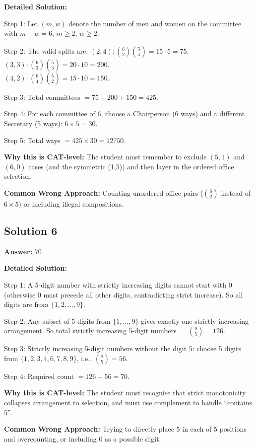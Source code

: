 \documentclass[11pt]{article}
\begin{document}
\textbf{Detailed Solution:}

Step 1: Let \( (m, w) \) denote the number of men and women on the committee with \( m + w = 6 \), \( m \ge 2 \), \( w \ge 2 \).

Step 2: The valid splits are:
\( (2, 4): \binom{6}{2}\binom{5}{4} = 15 \cdot 5 = 75. \) \\
\( (3, 3): \binom{6}{3}\binom{5}{3} = 20 \cdot 10 = 200. \) \\
\( (4, 2): \binom{6}{4}\binom{5}{2} = 15 \cdot 10 = 150. \)

Step 3: Total committees \( = 75 + 200 + 150 = 425 \).

Step 4: For each committee of 6, choose a Chairperson (6 ways) and a different Secretary (5 ways): \( 6 \times 5 = 30 \).

Step 5: Total ways \( = 425 \times 30 = 12750 \).

\textbf{Why this is CAT-level:} The student must remember to exclude \( (5,1) \) and \( (6,0) \) cases (and the symmetric (1,5)) and then layer in the ordered office selection.

\textbf{Common Wrong Approach:} Counting unordered office pairs (\( \binom{6}{2} \) instead of \( 6 \times 5 \)) or including illegal compositions.

\subsection*{Solution 6}
\textbf{Answer:} 70

\textbf{Detailed Solution:}

Step 1: A 5-digit number with strictly increasing digits cannot start with 0 (otherwise 0 must precede all other digits, contradicting strict increase). So all digits are from \( \{1, 2, \ldots, 9\} \).

Step 2: Any subset of 5 digits from \( \{1,\ldots,9\} \) gives exactly one strictly increasing arrangement. So total strictly increasing 5-digit numbers \( = \binom{9}{5} = 126 \).

Step 3: Strictly increasing 5-digit numbers without the digit 5: choose 5 digits from \( \{1,2,3,4,6,7,8,9\} \), i.e., \( \binom{8}{5} = 56 \).

Step 4: Required count \( = 126 - 56 = 70 \).

\textbf{Why this is CAT-level:} The student must recognise that strict monotonicity collapses arrangement to selection, and must use complement to handle ``contains 5''.

\textbf{Common Wrong Approach:} Trying to directly place 5 in each of 5 positions and overcounting, or including 0 as a possible digit.
\end{document}

